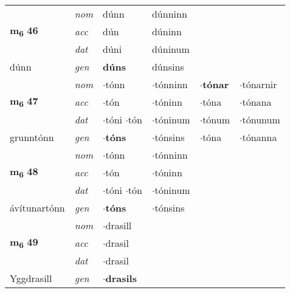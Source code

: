 \begin{longtable}[l]{llllll}
\multirow{3}{*}{{{\textbf{m{\textsubscript{6}}} \Large{\textbf{46}}}}}  & {\footnotesize{{\textit{nom}}}} & dúnn & dúnninn    & \textbf{} &   \\*
 &  {\footnotesize{{\textit{acc}}}} & dún  & dúninn   &   &  \\*
 &  {\footnotesize{{\textit{dat}}}} & dúni & dúninum   &  &  \\*
 {\footnotesize{dúnn}} &   {\footnotesize{{\textit{gen}}}} & \textbf{dúns}  & dúnsins  &  &  \\
\cmidrule{1-6}


\multirow{3}{*}{{{\textbf{m{\textsubscript{6}}} \Large{\textbf{47}}}}}  & {\footnotesize{{\textit{nom}}}} & $\cdot$tónn & $\cdot$tónninn    & \textbf{$\cdot$tónar} & $\cdot$tónarnir  \\*
 &  {\footnotesize{{\textit{acc}}}} & $\cdot$tón  & $\cdot$tóninn   & $\cdot$tóna  & $\cdot$tónana \\*
 &  {\footnotesize{{\textit{dat}}}} & \specialcell{$\cdot$tóni\\  $\cdot$tón} & $\cdot$tóninum   & $\cdot$tónum & $\cdot$tónunum \\*
 {\footnotesize{grunntónn}} &   {\footnotesize{{\textit{gen}}}} & \textbf{$\cdot$tóns}  & $\cdot$tónsins  & $\cdot$tóna & $\cdot$tónanna \\
\cmidrule{1-6}


\multirow{3}{*}{{{\textbf{m{\textsubscript{6}}} \Large{\textbf{48}}}}}  & {\footnotesize{{\textit{nom}}}} & $\cdot$tónn & $\cdot$tónninn    & \textbf{} &   \\*
 &  {\footnotesize{{\textit{acc}}}} & $\cdot$tón  & $\cdot$tóninn   &   &  \\*
 &  {\footnotesize{{\textit{dat}}}} & \specialcell{$\cdot$tóni\\  $\cdot$tón} & $\cdot$tóninum   &  &  \\*
 {\footnotesize{ávítunartónn}} &   {\footnotesize{{\textit{gen}}}} & \textbf{$\cdot$tóns}  & $\cdot$tónsins  &  &  \\
\cmidrule{1-6}


\multirow{3}{*}{{{\textbf{m{\textsubscript{6}}} \Large{\textbf{49}}}}}  & {\footnotesize{{\textit{nom}}}} & $\cdot$drasill &     & \textbf{} &   \\*
 &  {\footnotesize{{\textit{acc}}}} & $\cdot$drasil  &    &   &  \\*
 &  {\footnotesize{{\textit{dat}}}} & $\cdot$drasil &    &  &  \\*
 {\footnotesize{Yggdrasill}} &   {\footnotesize{{\textit{gen}}}} & \textbf{$\cdot$drasils}  &   &  &  \\
\cmidrule{1-6}



\end{longtable}
